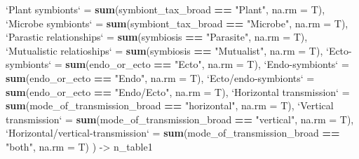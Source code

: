 \documentclass[
]{article}
\newenvironment{Shaded}{\begin{snugshade}}{\end{snugshade}}
\newcommand{\DataTypeTok}[1]{\textcolor[rgb]{0.13,0.29,0.53}{#1}}
\newcommand{\KeywordTok}[1]{\textcolor[rgb]{0.13,0.29,0.53}{\textbf{#1}}}
\newcommand{\NormalTok}[1]{#1}
\newcommand{\OperatorTok}[1]{\textcolor[rgb]{0.81,0.36,0.00}{\textbf{#1}}}
\newcommand{\StringTok}[1]{\textcolor[rgb]{0.31,0.60,0.02}{#1}}
\begin{document}
\begin{Shaded}
\begin{Highlighting}[]
{{{    \StringTok{`}\DataTypeTok{Plant symbionts}\StringTok{`}\NormalTok{  =}\StringTok{ }\KeywordTok{sum}\NormalTok{(symbiont_tax_broad  }\OperatorTok{==}\StringTok{ "Plant"}\NormalTok{, }\DataTypeTok{na.rm =}\NormalTok{ T),}
    \StringTok{`}\DataTypeTok{Microbe symbionts}\StringTok{`}\NormalTok{ =}\StringTok{ }\KeywordTok{sum}\NormalTok{(symbiont_tax_broad  }\OperatorTok{==}\StringTok{ "Microbe"}\NormalTok{, }\DataTypeTok{na.rm =}\NormalTok{ T),}
    \StringTok{`}\DataTypeTok{Parastic relationships}\StringTok{`}\NormalTok{ =}\StringTok{ }\KeywordTok{sum}\NormalTok{(symbiosis }\OperatorTok{==}\StringTok{ "Parasite"}\NormalTok{, }\DataTypeTok{na.rm =}\NormalTok{ T),}
    \StringTok{`}\DataTypeTok{Mutualistic relatioships}\StringTok{`}\NormalTok{ =}\StringTok{ }\KeywordTok{sum}\NormalTok{(symbiosis }\OperatorTok{==}\StringTok{ "Mutualist"}\NormalTok{, }\DataTypeTok{na.rm =}\NormalTok{ T),}
    \StringTok{`}\DataTypeTok{Ecto-symbionts}\StringTok{`}\NormalTok{ =}\StringTok{ }\KeywordTok{sum}\NormalTok{(endo_or_ecto  }\OperatorTok{==}\StringTok{ "Ecto"}\NormalTok{, }\DataTypeTok{na.rm =}\NormalTok{ T),}
    \StringTok{`}\DataTypeTok{Endo-symbionts}\StringTok{`}\NormalTok{ =}\StringTok{ }\KeywordTok{sum}\NormalTok{(endo_or_ecto }\OperatorTok{==}\StringTok{ "Endo"}\NormalTok{, }\DataTypeTok{na.rm =}\NormalTok{ T),}
    \StringTok{`}\DataTypeTok{Ecto/endo-symbionts}\StringTok{`}\NormalTok{ =}\StringTok{ }\KeywordTok{sum}\NormalTok{(endo_or_ecto }\OperatorTok{==}\StringTok{ "Endo/Ecto"}\NormalTok{, }\DataTypeTok{na.rm =}\NormalTok{ T),}
    \StringTok{`}\DataTypeTok{Horizontal transmission}\StringTok{`}\NormalTok{ =}\StringTok{ }\KeywordTok{sum}\NormalTok{(mode_of_transmission_broad  }\OperatorTok{==}\StringTok{ "horizontal"}\NormalTok{, }\DataTypeTok{na.rm =}\NormalTok{ T),}
    \StringTok{`}\DataTypeTok{Vertical transmission}\StringTok{`}\NormalTok{ =}\StringTok{ }\KeywordTok{sum}\NormalTok{(mode_of_transmission_broad }\OperatorTok{==}\StringTok{ "vertical"}\NormalTok{, }\DataTypeTok{na.rm =}\NormalTok{ T),}
    \StringTok{`}\DataTypeTok{Horizontal/vertical-transmission}\StringTok{`}\NormalTok{ =}\StringTok{ }\KeywordTok{sum}\NormalTok{(mode_of_transmission_broad }\OperatorTok{==}\StringTok{ "both"}\NormalTok{, }\DataTypeTok{na.rm =}\NormalTok{ T)}
\NormalTok{  ) ->}\StringTok{ }\NormalTok{n_table1}

}}}
\end{Highlighting}
\end{Shaded}
\end{document}
